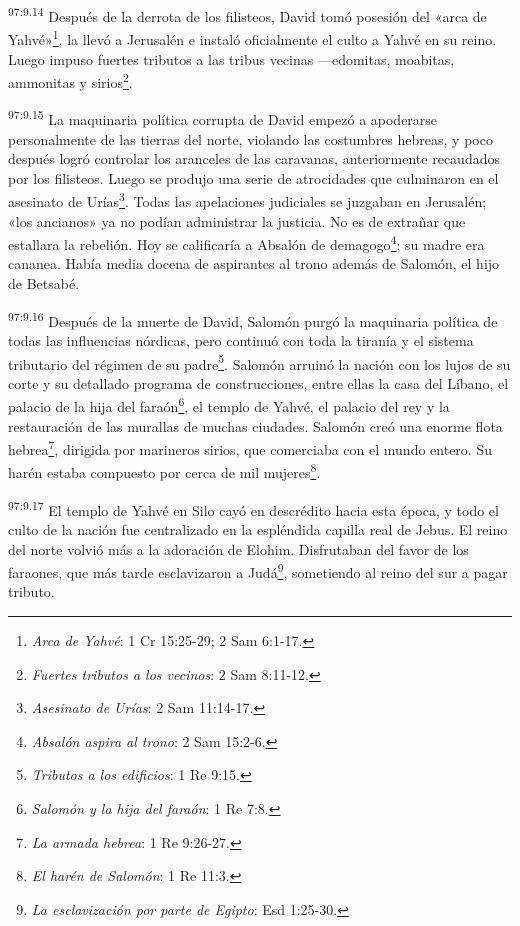 \par
\textsuperscript{97:9.14} Después de la derrota de los filisteos, David tomó posesión del «arca de Yahvé»\footnote{\textit{Arca de Yahvé}: 1 Cr 15:25-29; 2 Sam 6:1-17.}, la llevó a Jerusalén e instaló oficialmente el culto a Yahvé en su reino. Luego impuso fuertes tributos a las tribus vecinas ---edomitas, moabitas, ammonitas y sirios\footnote{\textit{Fuertes tributos a los vecinos}: 2 Sam 8:11-12.}.

\par
\textsuperscript{97:9.15} La maquinaria política corrupta de David empezó a apoderarse personalmente de las tierras del norte, violando las costumbres hebreas, y poco después logró controlar los aranceles de las caravanas, anteriormente recaudados por los filisteos. Luego se produjo una serie de atrocidades que culminaron en el asesinato de Urías\footnote{\textit{Asesinato de Urías}: 2 Sam 11:14-17.}. Todas las apelaciones judiciales se juzgaban en Jerusalén; «los ancianos» ya no podían administrar la justicia. No es de extrañar que estallara la rebelión. Hoy se calificaría a Absalón de demagogo\footnote{\textit{Absalón aspira al trono}: 2 Sam 15:2-6.}; su madre era cananea. Había media docena de aspirantes al trono además de Salomón, el hijo de Betsabé.

\par
\textsuperscript{97:9.16} Después de la muerte de David, Salomón purgó la maquinaria política de todas las influencias nórdicas, pero continuó con toda la tiranía y el sistema tributario del régimen de su padre\footnote{\textit{Tributos a los edificios}: 1 Re 9:15.}. Salomón arruinó la nación con los lujos de su corte y su detallado programa de construcciones, entre ellas la casa del Líbano, el palacio de la hija del faraón\footnote{\textit{Salomón y la hija del faraón}: 1 Re 7:8.}, el templo de Yahvé, el palacio del rey y la restauración de las murallas de muchas ciudades. Salomón creó una enorme flota hebrea\footnote{\textit{La armada hebrea}: 1 Re 9:26-27.}, dirigida por marineros sirios, que comerciaba con el mundo entero. Su harén estaba compuesto por cerca de mil mujeres\footnote{\textit{El harén de Salomón}: 1 Re 11:3.}.

\par
\textsuperscript{97:9.17} El templo de Yahvé en Silo cayó en descrédito hacia esta época, y todo el culto de la nación fue centralizado en la espléndida capilla real de Jebus. El reino del norte volvió más a la adoración de Elohim. Disfrutaban del favor de los faraones, que más tarde esclavizaron a Judá\footnote{\textit{La esclavización por parte de Egipto}: Esd 1:25-30.}, sometiendo al reino del sur a pagar tributo.

